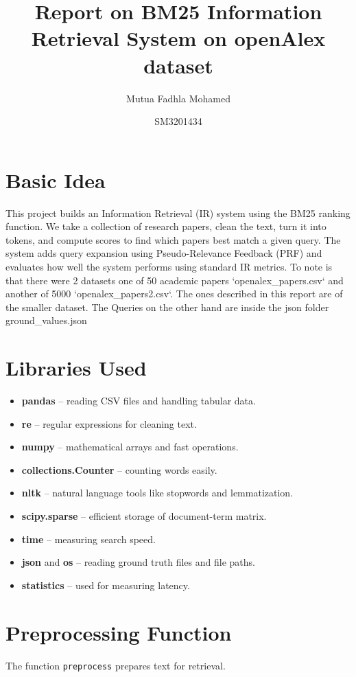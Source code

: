 \documentclass[a4paper,12pt]{article}
\title{Report on BM25 Information Retrieval System on openAlex dataset}
\author{Mutua Fadhla Mohamed}
\author{SM3201434}
\begin{document}
\maketitle

\section{Basic Idea}
This project builds an Information Retrieval (IR) system using the BM25 ranking function. 
We take a collection of research papers, clean the text, turn it into tokens, 
and compute scores to find which papers best match a given query. 
The system adds query expansion using Pseudo-Relevance Feedback (PRF) and evaluates 
how well the system performs using standard IR metrics.
To note is that there were 2 datasets one of 50 academic papers `openalex\_papers.csv` and another of 5000 `openalex\_papers2.csv`. The ones described in this report are of the smaller dataset. The Queries on the other hand are inside the json folder ground\_values.json

\section{Libraries Used}
\begin{itemize}
    \item \textbf{pandas} -- reading CSV files and handling tabular data.
    \item \textbf{re} -- regular expressions for cleaning text.
    \item \textbf{numpy} -- mathematical arrays and fast operations.
    \item \textbf{collections.Counter} -- counting words easily.
    \item \textbf{nltk} -- natural language tools like stopwords and lemmatization.
    \item \textbf{scipy.sparse} -- efficient storage of document-term matrix.
    \item \textbf{time} -- measuring search speed.
    \item \textbf{json} and \textbf{os} -- reading ground truth files and file paths.
    \item \textbf{statistics} -- used for measuring latency.
\end{itemize}

\section{Preprocessing Function}
The function \texttt{preprocess} prepares text for retrieval.
\end{document}
